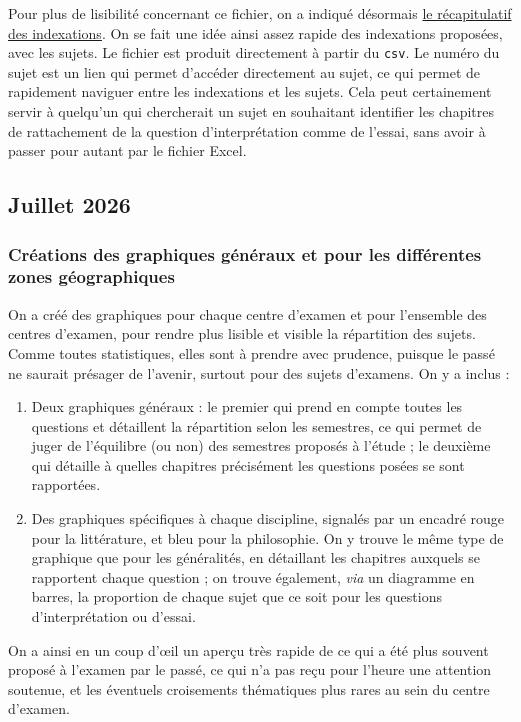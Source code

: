 Pour plus de lisibilité concernant ce fichier, on a indiqué désormais \hyperlink{synthesesujets}{le récapitulatif des indexations}. On se fait une idée ainsi assez rapide des indexations proposées, avec les sujets. Le fichier est produit directement à partir du \texttt{csv}. Le numéro du sujet est un lien qui permet d'accéder directement au sujet, ce qui permet de rapidement naviguer entre les indexations et les sujets. Cela peut certainement servir à quelqu'un qui chercherait un sujet en souhaitant identifier les chapitres de rattachement de la question d'interprétation comme de l'essai, sans avoir à passer pour autant par le fichier Excel.

\subsection{Juillet 2026}

\subsubsection{Créations des graphiques généraux et pour les différentes zones géographiques}

On a créé des graphiques pour chaque centre d'examen et pour l'ensemble des centres d'examen, pour rendre plus lisible et visible la répartition des sujets. Comme toutes statistiques, elles sont à prendre avec prudence, puisque le passé ne saurait présager de l'avenir, surtout pour des sujets d'examens. On y a inclus :

\begin{enumerate}
\item Deux graphiques généraux : le premier qui prend en compte toutes les questions et détaillent la répartition selon les semestres, ce qui permet de juger de l'équilibre (ou non) des semestres proposés à l'étude ; le deuxième qui détaille à quelles chapitres précisément les questions posées se sont rapportées.
\item Des graphiques spécifiques à chaque discipline, signalés par un encadré rouge pour la littérature, et bleu pour la philosophie. On y trouve le même type de graphique que pour les généralités, en détaillant les chapitres auxquels se rapportent chaque question ; on trouve également, \emph{via} un diagramme en barres, la proportion de chaque sujet que ce soit pour les questions d'interprétation ou d'essai.
\end{enumerate}

On a ainsi en un coup d'œil un aperçu très rapide de ce qui a été plus souvent proposé à l'examen par le passé, ce qui n'a pas reçu pour l'heure une attention soutenue, et les éventuels croisements thématiques plus rares au sein du centre d'examen.

